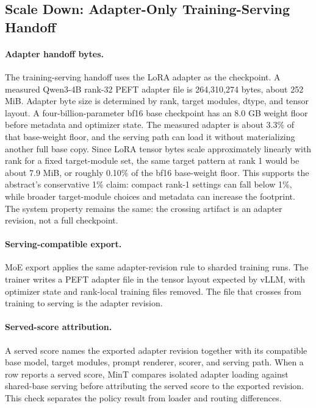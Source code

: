 

\subsection{Scale Down: Adapter-Only Training-Serving Handoff}

\paragraph{Adapter handoff bytes.}
The training-serving handoff uses the LoRA adapter as the checkpoint. A measured Qwen3-4B rank-32 PEFT adapter file is 264{,}310{,}274 bytes, about 252 MiB. Adapter byte size is determined by rank, target modules, dtype, and tensor layout. A four-billion-parameter bf16 base checkpoint has an 8.0 GB weight floor before metadata and optimizer state. The measured adapter is about 3.3\% of that base-weight floor, and the serving path can load it without materializing another full base copy. Since LoRA tensor bytes scale approximately linearly with rank for a fixed target-module set, the same target pattern at rank 1 would be about 7.9 MiB, or roughly 0.10\% of the bf16 base-weight floor. This supports the abstract's conservative 1\% claim: compact rank-1 settings can fall below 1\%, while broader target-module choices and metadata can increase the footprint. The system property remains the same: the crossing artifact is an adapter revision, not a full checkpoint.

\paragraph{Serving-compatible export.}
MoE export applies the same adapter-revision rule to sharded training runs. The trainer writes a PEFT adapter file in the tensor layout expected by vLLM, with optimizer state and rank-local training files removed. The file that crosses from training to serving is the adapter revision.

\paragraph{Served-score attribution.}
A served score names the exported adapter revision together with its compatible base model, target modules, prompt renderer, scorer, and serving path. When a row reports a served score, MinT compares isolated adapter loading against shared-base serving before attributing the served score to the exported revision. This check separates the policy result from loader and routing differences.

